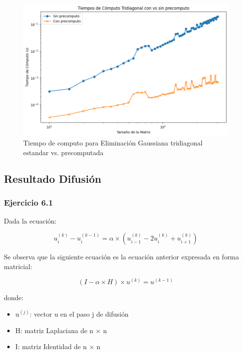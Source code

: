     \begin{figure}[H]
    \centerline{\includegraphics[scale=0.45]{./img/tiempos_tridiagConVsSinP.png}}
    \caption{Tiempo de computo para Eliminación Gaussiana tridiagonal estandar vs. precomputada}
    \label{result_ej5_2do}
    \end{figure}

\fi

\iffalse
    \subsection{Resultado Difusión}
    \label{difusion}
    \subsubsection{Ejercicio 6.1}
    Dada la ecuación:
    
    \begin{equation}
    u_{i}^{(k)} - u_{i}^{(k-1)} = \alpha \times (u_{i-1}^{(k)} - 2u_{i}^{(k)} + u_{i+1}^{(k)})
    \end{equation}

    Se observa que la siguiente ecuación es la ecuación anterior expresada en forma matricial:

    \begin{equation}
    (I - \alpha \times H) \times u^{(k)} = u^{(k-1)}
    \end{equation}

    donde:

    \begin{itemize}
      \item u$^{(j)}$: vector u en el paso j de difusión
      \item H: matriz Laplaciana de n $\times$ n
      \item I: matriz Identidad de n $\times$ n
    \end{itemize}

